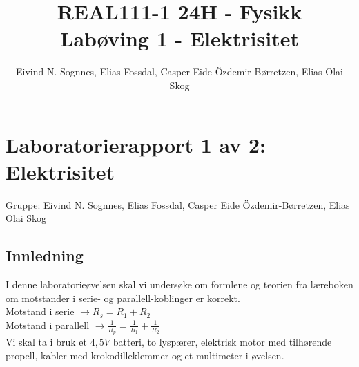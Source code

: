 \documentclass[norsk,11pt,a4paper]{report}
\title{REAL111-1 24H - Fysikk\\Labøving 1 - Elektrisitet}
\author{Eivind N. Sognnes, Elias Fossdal, Casper Eide Özdemir-Børretzen, Elias Olai Skog}
\date{}
\begin{document}



\section*{Laboratorierapport 1 av 2: Elektrisitet}
Gruppe: Eivind N. Sognnes, Elias Fossdal, Casper Eide Özdemir-Børretzen, Elias Olai Skog

\subsection*{Innledning}
I denne laboratorieøvelsen skal vi undersøke om formlene og teorien fra læreboken om motstander i serie- og parallell-koblinger er korrekt.\\[0.2cm]

Motstand i serie $\rightarrow \boxed{R_s = R_1 + R_2}$\\[0.2cm]

Motstand i parallell $\rightarrow \boxed{\frac{1}{R_p} = \frac{1}{R_1} + \frac{1}{R_2}}$\\[0.2cm]

Vi skal ta i bruk et $4,5V$ batteri, to lyspærer, elektrisk motor med tilhørende propell, kabler med krokodilleklemmer og et multimeter i øvelsen.
\end{document}
